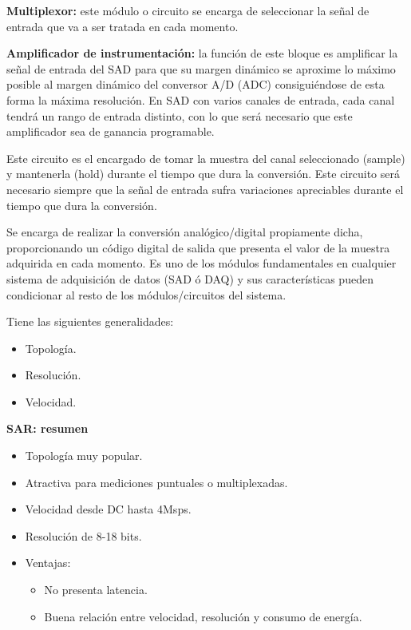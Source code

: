 \documentclass[12pt, letterpaper]{extarticle}
\begin{document}
\textbf{Multiplexor:} este módulo o circuito se encarga de seleccionar la señal de entrada que va a ser tratada en cada momento.

\textbf{Amplificador de instrumentación:} la función de este bloque es amplificar la señal de entrada del SAD para que su margen dinámico se aproxime lo máximo posible al margen dinámico del conversor A/D (ADC) consiguiéndose de esta forma la máxima resolución. En SAD con varios canales de entrada, cada canal tendrá un rango de entrada distinto, con lo que será necesario que este amplificador sea de ganancia programable.


Este circuito es el encargado de tomar la muestra del canal seleccionado (sample) y mantenerla (hold) durante el tiempo que dura la conversión. Este circuito será necesario siempre que la señal de entrada sufra variaciones apreciables durante el tiempo que dura la conversión.


Se encarga de realizar la conversión analógico/digital propiamente dicha, proporcionando un código digital de salida que presenta el valor de la muestra adquirida en cada momento. Es uno de los módulos fundamentales en cualquier sistema de adquisición de datos (SAD ó DAQ) y sus características pueden condicionar al resto de los módulos/circuitos del sistema.

Tiene las siguientes generalidades:
\begin{itemize}
    \item Topología.
    \item Resolución.
    \item Velocidad.
\end{itemize}


\noindent
\textbf{SAR: resumen}

\begin{itemize}
    \item Topología muy popular.
    \item Atractiva para mediciones puntuales o multiplexadas.
    \item Velocidad desde DC hasta 4Msps.
    \item Resolución de 8-18 bits.
    \item Ventajas:
    \begin{itemize}
        \item No presenta latencia.
        \item Buena relación entre velocidad, resolución y consumo de energía.
    \end{itemize}
\end{itemize}
\end{document}
